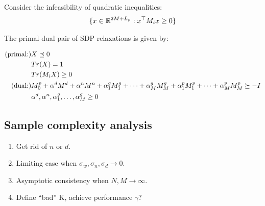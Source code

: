 \documentclass[11pt, onecolumn]{article}
\begin{document}
Consider the infeasibility  of quadratic inequalities:
\begin{align*}
  \{x\in\mathbb R^{2M + L_p} : x^\top M_i x \ge 0 \}
\end{align*}

The primal-dual pair of SDP relaxations is given by:

\begin{align*}
  \text{(primal:)} & X\preceq 0
  \\
  & Tr(X) = 1
  \\
  & Tr(M_i X)\ge 0
  \\
  \text{(dual:)} & M_0^p + \alpha^d M^d + \alpha^n M^n + \alpha^g_1 M^g_1 + \dots+ \alpha^g_M M^g_M +
  \alpha^p_1 M^p_1 +\dots + \alpha^p_M M^p_M \succeq -I
  \\
  & \alpha^d, \alpha^n,\alpha^g_1,\dots, \alpha^g_M\ge 0
\end{align*}




\subsection{Sample complexity analysis}

\begin{enumerate}
\item Get rid of $n$ or $d$.
\item Limiting case when $\sigma_w, \sigma_n,\sigma_d\to 0$.
\item Asymptotic consistency when $N,M\to \infty$.
\item Define ``bad'' K, achieve performance $\gamma$?
\end{enumerate}
\end{document}
